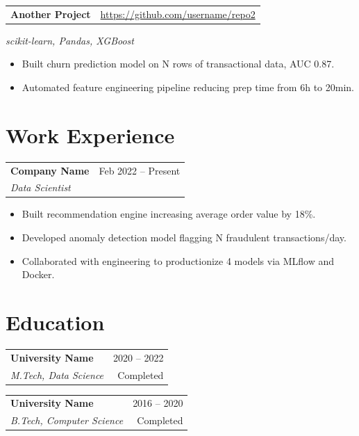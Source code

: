 \documentclass[10pt, a4paper]{article}
\makeatletter
\newcommand{\workentry}[4]{%
  \noindent
  \begin{tabularx}{\linewidth}{@{}X r@{}}
    \textbf{#1} & \textcolor{subtle}{\small #3} \\
    \textit{\small #2} &
  \end{tabularx}
  \vspace{1pt}
  #4
  \vspace{6pt}
}
\newcommand{\eduentry}[4]{%
  \noindent
  \begin{tabularx}{\linewidth}{@{}X r@{}}
    \textbf{#1} & \textcolor{subtle}{\small #4} \\
    \textit{\small #2} & \textcolor{subtle}{\small #3}
  \end{tabularx}
  \vspace{4pt}
}
\newcommand{\projectentry}[4]{%
  \noindent
  \begin{tabularx}{\linewidth}{@{}X r@{}}
    \textbf{#1} & \href{#3}{\textcolor{subtle}{\small #3}}
  \end{tabularx}
  \vspace{1pt}
  \textcolor{subtle}{\small \textit{#2}}
  \vspace{1pt}
  #4
  \vspace{6pt}
}
\makeatother
\begin{document}
\projectentry{Another Project}{scikit-learn, Pandas, XGBoost}{https://github.com/username/repo2}{%
  \begin{itemize}
    \item Built churn prediction model on N rows of transactional data, AUC 0.87.
    \item Automated feature engineering pipeline reducing prep time from 6h to 20min.
  \end{itemize}
}

\section{Work Experience}
\workentry{Company Name}{Data Scientist}{Feb 2022 -- Present}{%
  \begin{itemize}
    \item Built recommendation engine increasing average order value by 18\%.
    \item Developed anomaly detection model flagging N fraudulent transactions/day.
    \item Collaborated with engineering to productionize 4 models via MLflow and Docker.
  \end{itemize}
}

\section{Education}
\eduentry{University Name}{M.Tech, Data Science}{Completed}{2020 -- 2022}
\eduentry{University Name}{B.Tech, Computer Science}{Completed}{2016 -- 2020}

\end{document}
